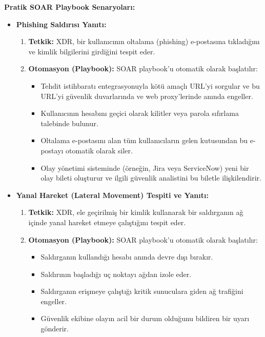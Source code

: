 \textbf{Pratik SOAR Playbook Senaryoları:}
\begin{itemize}
    \item \textbf{Phishing Saldırısı Yanıtı:}
    \begin{enumerate}
        \item \textbf{Tetkik:} XDR, bir kullanıcının oltalama (phishing) e-postasına tıkladığını ve kimlik bilgilerini girdiğini tespit eder.
        \item \textbf{Otomasyon (Playbook):} SOAR playbook'u otomatik olarak başlatılır:
        \begin{itemize}
            \item Tehdit istihbaratı entegrasyonuyla kötü amaçlı URL'yi sorgular ve bu URL'yi güvenlik duvarlarında ve web proxy'lerinde anında engeller.
            \item Kullanıcının hesabını geçici olarak kilitler veya parola sıfırlama talebinde bulunur.
            \item Oltalama e-postasını alan tüm kullanıcıların gelen kutusundan bu e-postayı otomatik olarak siler.
            \item Olay yönetimi sisteminde (örneğin, Jira veya ServiceNow) yeni bir olay bileti oluşturur ve ilgili güvenlik analistini bu biletle ilişkilendirir.
        \end{itemize}
    \end{enumerate}
    \item \textbf{Yanal Hareket (Lateral Movement) Tespiti ve Yanıtı:}
    \begin{enumerate}
        \item \textbf{Tetkik:} XDR, ele geçirilmiş bir kimlik kullanarak bir saldırganın ağ içinde yanal hareket etmeye çalıştığını tespit eder.
        \item \textbf{Otomasyon (Playbook):} SOAR playbook'u otomatik olarak başlatılır:
        \begin{itemize}
            \item Saldırganın kullandığı hesabı anında devre dışı bırakır.
            \item Saldırının başladığı uç noktayı ağdan izole eder.
            \item Saldırganın erişmeye çalıştığı kritik sunuculara giden ağ trafiğini engeller.
            \item Güvenlik ekibine olayın acil bir durum olduğunu bildiren bir uyarı gönderir.
        \end{itemize}
    \end{enumerate}
\end{itemize}


